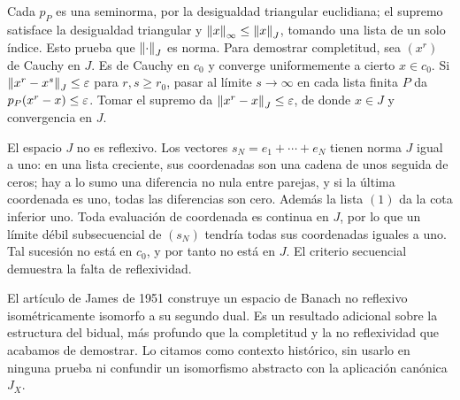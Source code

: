 Cada $p_P$ es una seminorma, por la desigualdad triangular euclidiana; el supremo satisface la desigualdad triangular y $\left\lVert x\right\rVert_\infty\leq\left\lVert x\right\rVert_J$, tomando una lista de un solo índice. Esto prueba que $\left\lVert\cdot\right\rVert_J$ es norma. Para demostrar completitud, sea $(x^r)$ de Cauchy en $J$. Es de Cauchy en $c_0$ y converge uniformemente a cierto $x\in c_0$. Si $\left\lVert x^r-x^s\right\rVert_J\leq\varepsilon$ para $r,s\geq r_0$, pasar al límite $s\to\infty$ en cada lista finita $P$ da $p_P(x^r-x)\leq\varepsilon$. Tomar el supremo da $\left\lVert x^r-x\right\rVert_J\leq\varepsilon$, de donde $x\in J$ y convergencia en $J$.

El espacio $J$ no es reflexivo. Los vectores $s_N=e_1+\cdots+e_N$ tienen norma $J$ igual a uno: en una lista creciente, sus coordenadas son una cadena de unos seguida de ceros; hay a lo sumo una diferencia no nula entre parejas, y si la última coordenada es uno, todas las diferencias son cero. Además la lista $(1)$ da la cota inferior uno. Toda evaluación de coordenada es continua en $J$, por lo que un límite débil subsecuencial de $(s_N)$ tendría todas sus coordenadas iguales a uno. Tal sucesión no está en $c_0$, y por tanto no está en $J$. El criterio secuencial demuestra la falta de reflexividad.

El artículo de James de 1951 \cite{james1951} construye un espacio de Banach no reflexivo isométricamente isomorfo a su segundo dual. Es un resultado adicional sobre la estructura del bidual, más profundo que la completitud y la no reflexividad que acabamos de demostrar. Lo citamos como contexto histórico, sin usarlo en ninguna prueba ni confundir un isomorfismo abstracto con la aplicación canónica $J_X$.

